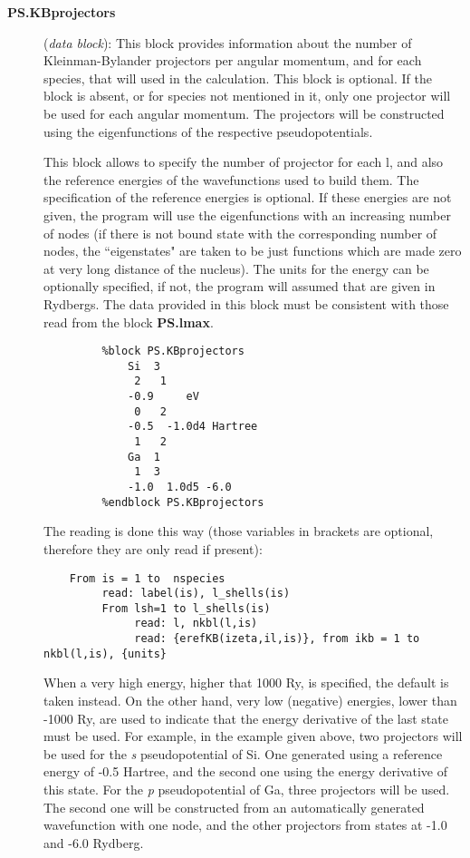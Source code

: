 \begin{description}
\item[{\bf PS.KBprojectors}] ({\it data block}):
This block provides information about the number of Kleinman-Bylander
projectors per angular momentum, and for each species, that will used
in the calculation. This block is optional.
If the block is absent, or for species not mentioned in it, only 
one projector will be used for each angular momentum. The projectors
will be constructed using the eigenfunctions of the respective
pseudopotentials. 


This block allows to specify the number of projector for each l, and also
the reference energies of the wavefunctions used to build them.
The specification of the reference energies is optional. If these 
energies are not given, the program will use the eigenfunctions with an
increasing number of nodes (if there is not bound state with
the corresponding number of nodes, the ``eigenstates" are taken to be just
functions which are made zero at very long distance of the nucleus).
The units for the energy can be optionally specified, if not, the 
program will assumed that are given in Rydbergs. 
The data provided in this block must be consistent with those 
read from the block {\bf PS.lmax}. 

\begin{verbatim}
         %block PS.KBprojectors
             Si  3
              2   1 
             -0.9     eV
              0   2
             -0.5  -1.0d4 Hartree
              1   2
             Ga  1
              1  3
             -1.0  1.0d5 -6.0
         %endblock PS.KBprojectors
\end{verbatim}

The reading is done this way (those variables in brackets are optional,
therefore they are only read if
present):

\begin{verbatim}
    From is = 1 to  nspecies
         read: label(is), l_shells(is)
         From lsh=1 to l_shells(is)
              read: l, nkbl(l,is)
              read: {erefKB(izeta,il,is)}, from ikb = 1 to nkbl(l,is), {units}
\end{verbatim}

When a very high energy, higher that 1000 Ry, is specified, the default is taken instead. 
On the other hand, 
very low (negative) energies, lower
than -1000 Ry, are used to indicate that the energy derivative of the
last state must be used. For example, in the example given 
above, two projectors will be used for the {\it s} pseudopotential
of Si. One generated using a reference energy of -0.5 Hartree, and the
second one using the energy derivative of this state. For the 
{\it p} pseudopotential of Ga, three projectors will be used. 
The second one will be constructed from an automatically generated 
wavefunction with one node, and the other projectors from states
at -1.0 and -6.0 Rydberg.


\end{description}

